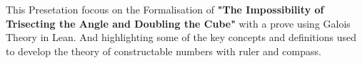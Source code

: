 This Presetation focous on the Formalisation of \textbf{"The Impossibility of Trisecting the Angle and Doubling the Cube"} with a prove using Galois Theory in Lean. 
And highlighting some of the key concepts and definitions used to develop the theory of constructable numbers with ruler and compass.